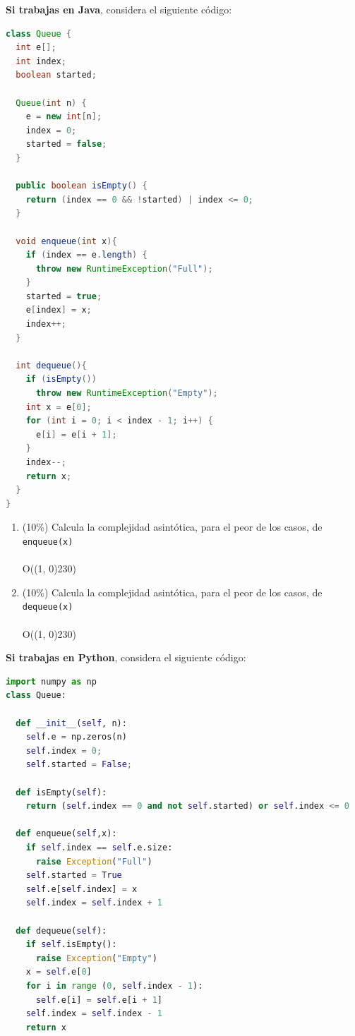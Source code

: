 \documentclass[10 pt]{article}
\begin{document}
\hspace{1 cm}

\textbf{Si trabajas en Java}, considera el siguiente código:

\begin{lstlisting}[language = Java]
class Queue {
  int e[];
  int index;
  boolean started;

  Queue(int n) {
    e = new int[n];
    index = 0;
    started = false;
  }

  public boolean isEmpty() {
    return (index == 0 && !started) | index <= 0;
  }

  void enqueue(int x){
    if (index == e.length) {
      throw new RuntimeException("Full");
    }
    started = true;
    e[index] = x;
    index++;
  }

  int dequeue(){
    if (isEmpty())
      throw new RuntimeException("Empty");
    int x = e[0];
    for (int i = 0; i < index - 1; i++) {
      e[i] = e[i + 1];
    }
    index--;
    return x;
  }
}
\end{lstlisting}

\begin{enumerate}[label=(\Alph*)]
  \item (10\%) Calcula la complejidad asintótica, para el peor de los casos, de 
   \texttt{enqueue(x)} \\ \\
   O(\line(1, 0){230})\\

  \item (10\%) Calcula la complejidad asintótica, para el peor de los casos, de 
   \texttt{dequeue(x)} \\ \\
   O(\line(1, 0){230})\\


\end{enumerate}

\newpage

\textbf{Si trabajas en Python}, considera el siguiente código:

\begin{lstlisting}[language = Python]
import numpy as np
class Queue:

  def __init__(self, n):
    self.e = np.zeros(n)
    self.index = 0;
    self.started = False;

  def isEmpty(self): 
    return (self.index == 0 and not self.started) or self.index <= 0

  def enqueue(self,x):
    if self.index == self.e.size:
      raise Exception("Full")
    self.started = True
    self.e[self.index] = x
    self.index = self.index + 1

  def dequeue(self):
    if self.isEmpty():
      raise Exception("Empty")
    x = self.e[0]
    for i in range (0, self.index - 1):
      self.e[i] = self.e[i + 1]
    self.index = self.index - 1
    return x
\end{lstlisting}
\end{document}
